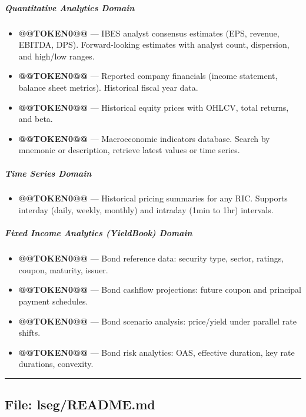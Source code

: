 \documentclass[11pt]{article}
\begin{document}
\subparagraph{Quantitative Analytics Domain}\mbox{}\par
\begin{itemize}[leftmargin=*,itemsep=2pt,topsep=2pt]
\item {} \textbf{@@TOKEN0@@} — IBES analyst consensus estimates (EPS, revenue, EBITDA, DPS). Forward-looking estimates with analyst count, dispersion, and high/low ranges.
\item {} \textbf{@@TOKEN0@@} — Reported company financials (income statement, balance sheet metrics). Historical fiscal year data.
\item {} \textbf{@@TOKEN0@@} — Historical equity prices with OHLCV, total returns, and beta.
\item {} \textbf{@@TOKEN0@@} — Macroeconomic indicators database. Search by mnemonic or description, retrieve latest values or time series.
\end{itemize}

\subparagraph{Time Series Domain}\mbox{}\par
\begin{itemize}[leftmargin=*,itemsep=2pt,topsep=2pt]
\item {} \textbf{@@TOKEN0@@} — Historical pricing summaries for any RIC. Supports interday (daily, weekly, monthly) and intraday (1min to 1hr) intervals.
\end{itemize}

\subparagraph{Fixed Income Analytics (YieldBook) Domain}\mbox{}\par
\begin{itemize}[leftmargin=*,itemsep=2pt,topsep=2pt]
\item {} \textbf{@@TOKEN0@@} — Bond reference data: security type, sector, ratings, coupon, maturity, issuer.
\item {} \textbf{@@TOKEN0@@} — Bond cashflow projections: future coupon and principal payment schedules.
\item {} \textbf{@@TOKEN0@@} — Bond scenario analysis: price/yield under parallel rate shifts.
\item {} \textbf{@@TOKEN0@@} — Bond risk analytics: OAS, effective duration, key rate durations, convexity.
\end{itemize}

\vspace{0.8em}\hrule\vspace{0.8em}

\subsection{File: lseg/README.md}\label{file:lseg-README.md}
\end{document}
